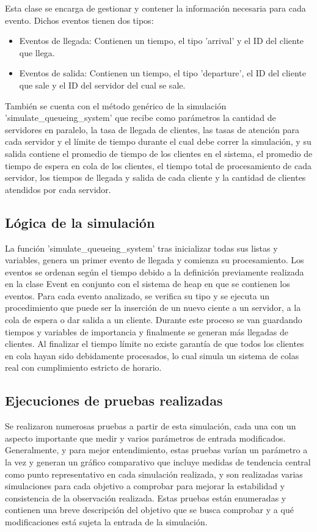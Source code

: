 \documentclass[12pt,a4paper]{article}
\begin{document}
\newpage
Esta clase se encarga de gestionar y contener la información necesaria para cada evento. Dichos eventos tienen
dos tipos:
\begin{itemize}
\item Eventos de llegada: Contienen un tiempo, el tipo 'arrival' y el ID del cliente que llega.
\item Eventos de salida: Contienen un tiempo, el tipo 'departure', el ID del cliente que sale y el ID del servidor del cual se sale.
\end{itemize}
También se cuenta con el método genérico de la simulación 'simulate\_queueing\_system' que recibe como parámetros la cantidad de servidores en paralelo, la tasa de llegada de clientes, las tasas de atención para cada servidor y el límite de tiempo durante el cual debe correr la simulación, y su salida contiene el promedio de tiempo de los clientes en el sistema, el promedio de tiempo de espera en cola de los clientes, el tiempo total de procesamiento de cada servidor, los tiempos de llegada y salida de cada cliente y la cantidad de clientes atendidos por cada servidor.

\subsection{Lógica de la simulación}
La función 'simulate\_queueing\_system' tras inicializar todas sus listas y variables, genera un primer evento de llegada y comienza
su procesamiento. Los eventos se ordenan según el tiempo debido a la definición previamente realizada en la clase Event en conjunto
con el sistema de heap en que se contienen los eventos. Para cada evento analizado, se verifica su tipo y se ejecuta un
procedimiento que puede ser la inserción de un nuevo ciente a un servidor, a la cola de espera o dar salida a un cliente. Durante
este proceso se van guardando tiempos y variables de importancia y finalmente se generan más llegadas de clientes. Al finalizar
el tiempo límite no existe garantía de que todos los clientes en cola hayan sido debidamente procesados, lo cual simula un sistema
de colas real con cumplimiento estricto de horario.

\subsection{Ejecuciones de pruebas realizadas}
Se realizaron numerosas pruebas a partir de esta simulación, cada una con un aspecto importante que medir y varios parámetros de
entrada modificados. Generalmente, y para mejor entendimiento, estas pruebas varían un parámetro a la vez y generan un gráfico
comparativo que incluye medidas de tendencia central como punto representativo en cada simulación realizada, y son realizadas
varias simulaciones para cada objetivo a comprobar para mejorar la estabilidad y consistencia de la observación realizada.
Estas pruebas están enumeradas y contienen una breve descripción del objetivo que se busca comprobar y a qué modificaciones está
sujeta la entrada de la simulación.
\end{document}
